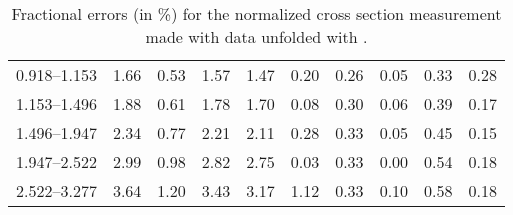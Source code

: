 \begin{table}
\begin{center}
\begin{tabular}{@{}l l l l l l l l l l@{}}
            0.918--1.153     &  1.66   &  0.53   &  1.57         &  1.47      &  0.20    &  0.26  &  0.05       &  0.33  &  0.28  \\
            1.153--1.496     &  1.88   &  0.61   &  1.78         &  1.70      &  0.08    &  0.30  &  0.06       &  0.39  &  0.17  \\
            1.496--1.947     &  2.34   &  0.77   &  2.21         &  2.11      &  0.28    &  0.33  &  0.05       &  0.45  &  0.15  \\
            1.947--2.522     &  2.99   &  0.98   &  2.82         &  2.75      &  0.03    &  0.33  &  0.00       &  0.54  &  0.18  \\
            2.522--3.277     &  3.64   &  1.20   &  3.43         &  3.17      &  1.12    &  0.33  &  0.10       &  0.58  &  0.18  \\
            \bottomrule
        \end{tabular}
    \end{center}
    \caption[
        Fractional errors for the normalized cross section measurement
        made with data unfolded with \POWHEG.
    ]{
        Fractional errors (in \%) for the normalized cross section measurement
        made with data unfolded with \POWHEG.
    }
    \label{tab:sys_uncert_norm_powheg}
\end{table}
